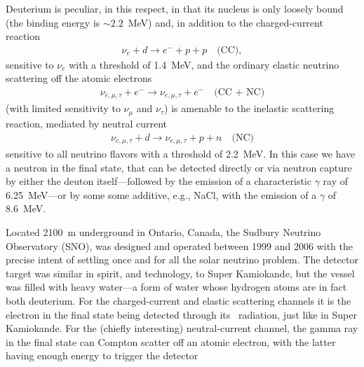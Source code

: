 Deuterium is peculiar, in this respect, in that its nucleus is only loosely bound
(the binding energy is $\sim 2.2$~MeV) and, in addition to the charged-current reaction
\begin{align*}
  \nu_e + d \rightarrow e^- + p + p \quad\text{(CC)},
\end{align*}
sensitive to $\nu_e$ with a threshold of 1.4~MeV, and the ordinary elastic neutrino
scattering off the atomic electrons
\begin{align*}
  \nu_{e, \mu, \tau} + e^- \rightarrow  \nu_{e, \mu, \tau} + e^-
  \quad\text{(CC + NC)}
\end{align*}
(with limited sensitivity to $\nu_\mu$ and $\nu_\tau$) is amenable to the inelastic
scattering reaction, mediated by neutral current
\begin{align*}
  \nu_{e, \mu, \tau} + d \rightarrow  \nu_{e, \mu, \tau} + p + n
  \quad\text{(NC)}
\end{align*}
sensitive to all neutrino flavors with a threshold of 2.2~MeV. In this case we have
a neutron in the final state, that can be detected directly or via neutron capture
by either the deuton itself---followed by the emission of a characteristic $\gamma$
ray of 6.25~MeV---or by some some additive, e.g., NaCl, with the emission of a
$\gamma$ of 8.6~MeV.

Located 2100~m underground in Ontario, Canada, the Sudbury Neutrino Observatory (SNO),
was designed and operated between 1999 and 2006 with the precise intent of settling once
and for all the solar neutrino problem. The detector target was similar in spirit,
and technology, to Super Kamiokande, but the vessel was filled with heavy water---a
form of water whose hydrogen atoms are in fact both deuterium.
For the charged-current and elastic scattering channels it is the electron
in the final state being detected through its \cherenkov\ radiation, just like in
Super Kamiokande. For the (chiefly interesting) neutral-current channel, the gamma
ray in the final state can Compton scatter off an atomic electron, with the latter
having enough energy to trigger the detector

